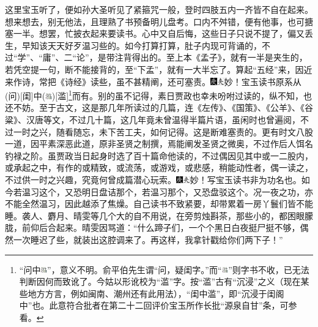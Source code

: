 这里宝玉听了，便如孙大圣听见了紧箍咒一般，登时四肢五内一齐皆不自在起来。想来想去，别无他法，且理熟了书预备明儿盘考。口内不舛错，便有他事，也可搪塞一半。想罢，忙披衣起来要读书。心中又自后悔，这些日子只说不提了，偏又丢生，早知该天天好歹温习些的。如今打算打算，肚子内现可背诵的，不过“学”、“庸”、二“论”，是带注背得出的。至上本《孟子》，就有一半是夹生的，若凭空提一句，断不能接背的，至“下孟”，就有一大半忘了。算起“五经”来，因近来作诗，常把《诗经》读些，虽不甚精阐，还可塞责。{\includegraphics[width=3mm]{../Images/00004}\includegraphics[width=3mm]{../Images/00012}\footnotesize \kaishu 妙！宝玉读书原系从{(问)}{[}闺{]}中{(\includegraphics[width=8pt,height=8pt,align=c,vshift=1pt]{../images/00030})}{[}滥{]}\footnote{“问中\includegraphics[width=8pt,height=8pt,align=c,vshift=1pt]{../images/00030}”，意义不明。俞平伯先生谓“问，疑闺字。”而“\includegraphics[width=8pt,height=8pt,align=c,vshift=1pt]{../images/00030}”则字书不收，已无法判断因何而致讹了。今姑以形讹校为“滥”字。按“滥”古有“沉浸”之义（现在某些地方方言，例如闽南、潮州还有此用法），“闺中滥”，即“沉浸于闺阁中”也。此意符合批者在第二十二回评价宝玉所作长批“源泉自甘”条，可参看。}而有。}别的虽不记得，素日贾政也幸未吩咐过读的，纵不知，也还不妨。至于古文，这是那几年所读过的几篇，连《左传》、《国策》、《公羊》、《谷粱》、汉唐等文，不过几十篇，这几年竟未曾温得半篇片语，虽闲时也曾遍阅，不过一时之兴，随看随忘，未下苦工夫，如何记得。这是断难塞责的。更有时文八股一道，因平素深恶此道，原非圣贤之制撰，焉能阐发圣贤之微奥，不过作后人饵名钓禄之阶。虽贾政当日起身时选了百十篇命他读的，不过偶因见其中或一二股内，或承起之中，有作的或精致，或流荡，或游戏，或悲感，稍能动性者，偶一读之，不过供一时之兴趣，究竟何曾成篇潜心玩索。{\includegraphics[width=3mm]{../Images/00004}\includegraphics[width=3mm]{../Images/00012}\footnotesize \kaishu 妙！写宝玉读书非为功名也。}如今若温习这个，又恐明日盘诘那个，若温习那个，又恐盘驳这个。况一夜之功，亦不能全然温习，因此越添了焦燥。自己读书不致紧要，却带累着一房丫鬟们皆不能睡。袭人、麝月、晴雯等几个大的自不用说，在旁剪烛斟茶，那些小的，都困眼朦胧，前仰后合起来。晴雯因骂道：“什么蹄子们，一个个黑日白夜挺尸挺不够，偶然一次睡迟了些，就装出这腔调来了。再这样，我拿针戳给你们两下子！”

